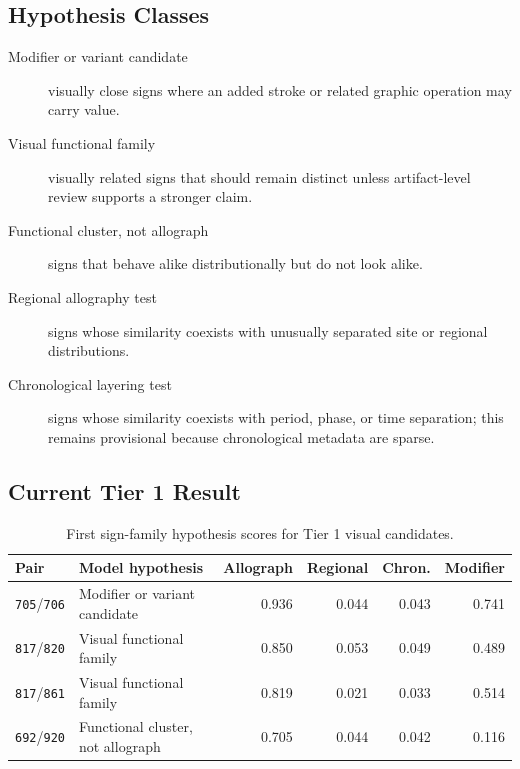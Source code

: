 \subsection{Hypothesis Classes}

\begin{description}
  \item[Modifier or variant candidate] visually close signs where an added stroke or related graphic operation may carry value.
  \item[Visual functional family] visually related signs that should remain distinct unless artifact-level review supports a stronger claim.
  \item[Functional cluster, not allograph] signs that behave alike distributionally but do not look alike.
  \item[Regional allography test] signs whose similarity coexists with unusually separated site or regional distributions.
  \item[Chronological layering test] signs whose similarity coexists with period, phase, or time separation; this remains provisional because chronological metadata are sparse.
\end{description}

\subsection{Current Tier 1 Result}

\begin{table}[htbp]
\centering
\begin{tabular}{p{}p{}rrrr}
\toprule
\textbf{Pair} & \textbf{Model hypothesis} & \textbf{Allograph} & \textbf{Regional} & \textbf{Chron.} & \textbf{Modifier} \\
\midrule
\texttt{705}/\texttt{706} & Modifier or variant candidate & 0.936 & 0.044 & 0.043 & 0.741 \\
\texttt{817}/\texttt{820} & Visual functional family & 0.850 & 0.053 & 0.049 & 0.489 \\
\texttt{817}/\texttt{861} & Visual functional family & 0.819 & 0.021 & 0.033 & 0.514 \\
\texttt{692}/\texttt{920} & Functional cluster, not allograph & 0.705 & 0.044 & 0.042 & 0.116 \\
\bottomrule
\end{tabular}
\caption{First sign-family hypothesis scores for Tier 1 visual candidates.}
\label{tab:sign-family-tier1}
\end{table}

